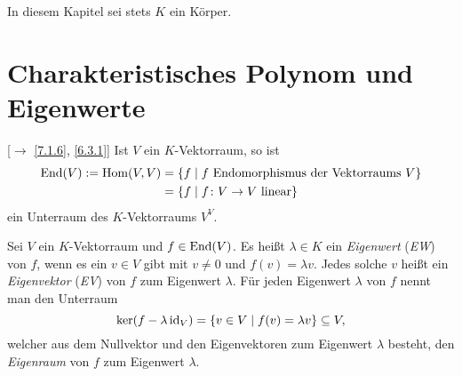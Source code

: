 \documentclass[../../main.tex]{subfiles}
\begin{document}
In diesem Kapitel sei stets $K$ ein Körper.

\section{Charakteristisches Polynom und Eigenwerte}

\begin{notrep}\label{10.1.1}
[$\to$ \ref{7.1.6}, \ref{6.3.1}] Ist $V$ ein $K$-Vektorraum, so ist
\begin{align*}
\operatorname{End}(V) := \operatorname{Hom}(V,V) & = \left\{f\mid f\text{ Endomorphismus der Vektorraums }V\right\}\\
& = \left\{f\mid f\colon V\to V \text{ linear}\right\}
\end{align*}
ein Unterraum des $K$-Vektorraums $V^V$.
\end{notrep}

\begin{df}\label{10.1.2}
Sei $V$ ein $K$-Vektorraum und $f\in \operatorname{End}(V)$. Es heißt $\lambda\in K$ ein \emph{Eigenwert} (\emph{EW}) von $f$, wenn es ein $v\in V$ gibt mit $v\ne 0$ und $f(v) = \lambda v$. Jedes solche $v$ heißt ein \emph{Eigenvektor} (\emph{EV}) von $f$ zum Eigenwert $\lambda$. Für jeden Eigenwert $\lambda$ von $f$ nennt man den Unterraum \[\ker(f-\lambda\operatorname{id}_V) = \left\{v\in V\mid f(v) = \lambda v\right\}\subseteq V,\] welcher aus dem Nullvektor und den Eigenvektoren zum Eigenwert $\lambda$ besteht, den \emph{Eigenraum} von $f$ zum Eigenwert $\lambda$.
\end{df}
\end{document}
